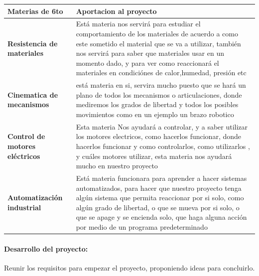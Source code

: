 \documentclass[11pt,a4paper]{article}
\begin{document}
\newpage
\begin{tabular}{|p{5.5cm}|p{7cm}|}
\hline 
\textbf{Materias de 6to} & \textbf{Aportacion al proyecto} \\ \hline
\textbf{Resistencia de materiales} & Está materia nos servirá para estudiar el comportamiento de los materiales de acuerdo a como este sometido el material que se va a utilizar, también nos servirá para saber que materiales usar en un momento dado, y para ver como reaccionará el materiales en condiciónes de calor,humedad, presión etc
 \\ \hline
\textbf{Cinematica de mecanismos} & está materia en si, servira mucho puesto que se hará un plano de todos los mecanismos o articulaciones, donde mediremos los grados de libertad y todos los posibles movimientos como en un ejemplo un brazo robotico  \\ \hline
\textbf{Control de motores eléctricos} & Esta materia Nos ayudará a controlar, y a saber utilizar los motores electricos, como hacerlos funcionar, donde hacerlos funcionar y como controlarlos, como utilizarlos , y cuáles motores utilizar, esta materia nos ayudará mucho en nuestro proyecto \\ \hline
\textbf{Automatización industrial } & Está materia funcionara para aprender a hacer sistemas automatizados, para hacer que nuestro proyecto tenga algún sistema que permita reaccionar por si solo, como algún grado de libertad,  o que se mueva por si solo, o que se apage y se encienda solo, que haga alguna acción por medio de un programa predeterminado  \\ \hline

\end{tabular}
\paragraph{Desarrollo del proyecto:}
Reunir los requisitos para empezar el proyecto, proponiendo ideas para concluirlo.

\cite{ruiperez2016diseno,}


\end{document}
